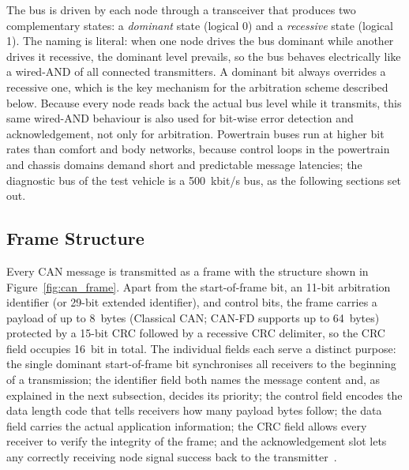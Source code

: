 \documentclass[11pt,a4paper,oneside,parskip=half]{scrreprt}
\begin{document}
The bus is driven by each node through a transceiver that produces two complementary states: a \textit{dominant} state (logical 0) and a \textit{recessive} state (logical 1). The naming is literal: when one node drives the bus dominant while another drives it recessive, the dominant level prevails, so the bus behaves electrically like a wired-AND of all connected transmitters. A dominant bit always overrides a recessive one, which is the key mechanism for the arbitration scheme described below. Because every node reads back the actual bus level while it transmits, this same wired-AND behaviour is also used for bit-wise error detection and acknowledgement, not only for arbitration. Powertrain buses run at higher bit rates than comfort and body networks, because control loops in the powertrain and chassis domains demand short and predictable message latencies; the diagnostic bus of the test vehicle is a 500~kbit/s bus, as the following sections set out.

\subsection{Frame Structure}
Every CAN message is transmitted as a frame with the structure shown in Figure~\ref{fig:can_frame}. Apart from the start-of-frame bit, an 11-bit arbitration identifier (or 29-bit extended identifier), and control bits, the frame carries a payload of up to 8~bytes (Classical CAN; CAN-FD supports up to 64~bytes) protected by a 15-bit CRC followed by a recessive CRC delimiter, so the CRC field occupies 16~bit in total. The individual fields each serve a distinct purpose: the single dominant start-of-frame bit synchronises all receivers to the beginning of a transmission; the identifier field both names the message content and, as explained in the next subsection, decides its priority; the control field encodes the data length code that tells receivers how many payload bytes follow; the data field carries the actual application information; the CRC field allows every receiver to verify the integrity of the frame; and the acknowledgement slot lets any correctly receiving node signal success back to the transmitter~\cite{iso11898}.
\end{document}
